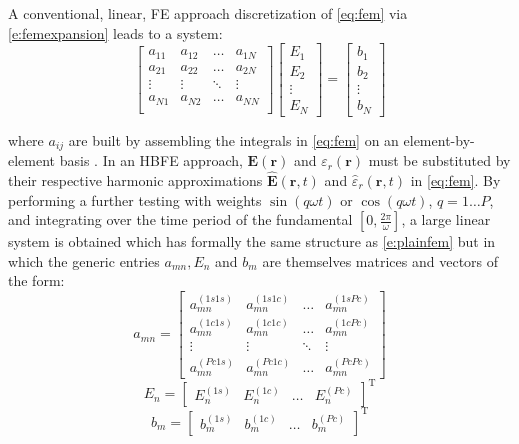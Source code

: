 \documentclass[journal]{IEEEtran}
\renewcommand{\vec}[1]{\mathbf{#1}}
\begin{document}
A conventional, linear, FE approach discretization of \eqref{eq:fem} via
\eqref{e:femexpansion} leads to a system:
%
\begin{equation}\label{e:plainfem}
\begin{bmatrix}
a_{11} & a_{12} & \ldots & a_{1N} \\
a_{21} & a_{22} & \ldots & a_{2N} \\
\vdots & \vdots & \ddots & \vdots \\
a_{N1} & a_{N2} & \ldots & a_{NN} \\
\end{bmatrix}
\begin{bmatrix}
E_1\\
E_2\\
\vdots\\
E_N
\end{bmatrix}
=
\begin{bmatrix}
b_1\\
b_2\\
\vdots\\
b_N
\end{bmatrix}
\end{equation}

\noindent where $a_{ij}$ are built by assembling the integrals in \eqref{eq:fem}
on an element-by-element basis \cite{Pelosi2009}. In an HBFE approach, $\vec{E}(\vec{r})$ and
${\varepsilon}_r(\vec{r})$ must be substituted by their respective harmonic approximations $\vec{\hat{E}}(\vec{r}, t)$ and $\hat{{\varepsilon}}_r(\vec{r}, t)$ in \eqref{eq:fem}.  By performing
a further testing with weights $\sin(q \omega t)$ or
$\cos(q \omega t)$, $q = 1 \dots P$, and integrating over the time period of the fundamental $\left [
0,\frac{2\pi}{\omega} \right ]$,  a large linear system is
obtained which has formally the same structure as \eqref{e:plainfem} but in
which the generic entries $a_{mn}, E_n$ and $b_m$ are themselves matrices and vectors of the form:
%
\begin{equation}\label{e:HBfemmn}
a_{mn}=
\begin{bmatrix}
a_{mn}^{(1s1s)} & a_{mn}^{(1s1c)} & \ldots &  a_{mn}^{(1sPc)} \\
a_{mn}^{(1c1s)} & a_{mn}^{(1c1c)} & \ldots &  a_{mn}^{(1cPc)} \\
\vdots & \vdots & \ddots & \vdots \\
a_{mn}^{(Pc1s)} & a_{mn}^{(Pc1c)} & \ldots &  a_{mn}^{(PcPc)}
\end{bmatrix}
\end{equation}
\begin{equation} 
E_n = 
\begin{bmatrix}
E_{n}^{(1s)} &
E_{n}^{(1c)} &
\ldots &
E_{n}^{(Pc)}
\end{bmatrix}^\text{T}
\end{equation}
\begin{equation} 
b_m = 
\begin{bmatrix}
b_{m}^{(1s)} &
b_{m}^{(1c)} &
\ldots &
b_{m}^{(Pc)}
\end{bmatrix}^\text{T}
\end{equation}
\end{document}
